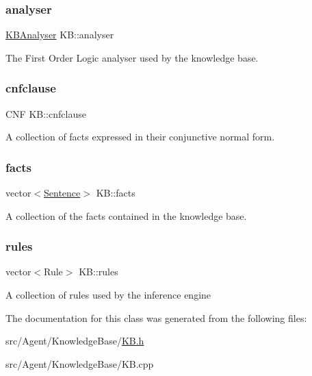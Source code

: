 \subsubsection{\texorpdfstring{analyser}{analyser}}
{\footnotesize\ttfamily \mbox{\hyperlink{classKBAnalyser}{K\+B\+Analyser}} K\+B\+::analyser\hspace{0.3cm}{\ttfamily [private]}}

The First Order Logic analyser used by the knowledge base. \mbox{\label{classKB_a810edf2192bea36c1ec95f4610fc669b}} 
\subsubsection{\texorpdfstring{cnfclause}{cnfclause}}
{\footnotesize\ttfamily C\+NF K\+B\+::cnfclause\hspace{0.3cm}{\ttfamily [private]}}

A collection of facts expressed in their conjunctive normal form. \mbox{\label{classKB_abf6528e5e8b106c9ec57dc6a8fb86ee7}} 
\subsubsection{\texorpdfstring{facts}{facts}}
{\footnotesize\ttfamily vector$<$\mbox{\hyperlink{classSentence}{Sentence}}$>$ K\+B\+::facts\hspace{0.3cm}{\ttfamily [private]}}

A collection of the facts contained in the knowledge base. \mbox{\label{classKB_a41204b166f5cf54eac4d59df9f43c07a}} 
\subsubsection{\texorpdfstring{rules}{rules}}
{\footnotesize\ttfamily vector$<$Rule$>$ K\+B\+::rules\hspace{0.3cm}{\ttfamily [private]}}

A collection of rules used by the inference engine 

The documentation for this class was generated from the following files\+:\begin{DoxyCompactItemize}
\item 
src/\+Agent/\+Knowledge\+Base/\mbox{\hyperlink{KB_8h}{K\+B.\+h}}\item 
src/\+Agent/\+Knowledge\+Base/K\+B.\+cpp\end{DoxyCompactItemize}
